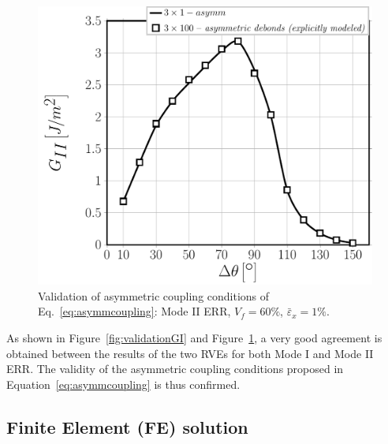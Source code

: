 \documentclass[smallextended]{svjour3}       %
\begin{document}
\begin{figure}[!h]
\centering
\includegraphics[width=\textwidth]{asymm-vs-explmodel-vf60-GII.pdf}
\caption{Validation of asymmetric coupling conditions of Eq.~\ref{eq:asymmcoupling}: Mode II ERR, $V_{f}=60\%$, $\bar{\varepsilon}_{x}=1\%$.}\label{fig:validationGII}
\end{figure}

As shown in Figure~\ref{fig:validationGI} and Figure~\ref{fig:validationGII}, a very good agreement is obtained between the results of the two RVEs for both Mode I and Mode II ERR. The validity of the asymmetric coupling conditions proposed in Equation~\ref{eq:asymmcoupling} is thus confirmed.

\subsection{Finite Element (FE) solution}
\end{document}

